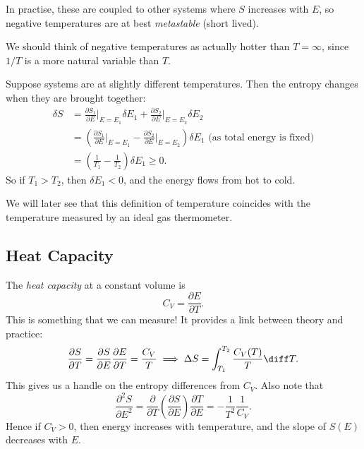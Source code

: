 \documentclass[12pt]{article}
\begin{document}
In practise, these are coupled to other systems where $S$ increases with $E$, so negative temperatures are at best \emph{metastable} (short lived).

We should think of negative temperatures as actually hotter than $T = \infty$, since $1/T$ is a more natural variable than $T$.

Suppose systems are at slightly different temperatures. Then the entropy changes when they are brought together:
\begin{align*}
	\delta S &= \frac{\partial S_1}{\partial E} \biggr|_{E = E_1} \delta E_1 + \frac{\partial S_2}{\partial E} \biggr|_{E = E_2} \delta E_2 \\
		 &= \left( \frac{\partial S_1}{\partial E} \biggr|_{E = E_1} - \frac{\partial S_2}{\partial E} \biggr|_{E = E_2} \right) \delta E_1  \text{ (as total energy is fixed)} \\
		 &= \left( \frac1{T_1} - \frac1{T_2} \right) \delta E_1 \geq 0.
\end{align*}
So if $T_1 > T_2$, then $\delta E_1 < 0$, and the energy flows from hot to cold.

We will later see that this definition of temperature coincides with the temperature measured by an ideal gas thermometer.

\subsection{Heat Capacity}
\label{sub:heat_cap}

The \emph{heat capacity} at a constant volume is
\[
C_V = \frac{\partial E}{\partial T}.
\]
This is something that we can measure! It provides a link between theory and practice:
\[
	\frac{\partial S}{\partial T} = \frac{\partial S}{\partial E} \frac{\partial E}{\partial T} = \frac{C_V}{T} \implies \Delta S = \int_{T_1}^{T_2} \frac{C_V(T)}{T} \diff T.
\]
This gives us a handle on the entropy differences from $C_V$. Also note that
\[
	\frac{\partial^2 S}{\partial E^2} = \frac{\partial}{\partial T} \left( \frac{\partial S}{\partial E} \right) \frac{\partial T}{\partial E} = - \frac{1}{T^2} \frac{1}{C_V}.
\]
Hence if $C_V > 0$, then energy increases with temperature, and the slope of $S(E)$ decreases with $E$.
\end{document}
